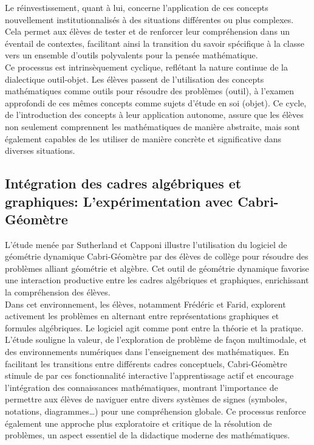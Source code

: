 Le réinvestissement,
quant à lui,
concerne l'application de ces concepts nouvellement institutionnalisés à des situations différentes ou plus complexes.
Cela permet aux élèves de tester et de renforcer leur compréhension dans un éventail de contextes,
facilitant ainsi la transition du savoir spécifique à la classe vers un ensemble d'outils polyvalents pour la pensée mathématique.\\

Ce processus est intrinsèquement cyclique,
reflétant la nature continue de la dialectique outil-objet.
Les élèves passent de l'utilisation des concepts mathématiques comme outils pour résoudre des problèmes (outil),
à l'examen approfondi de ces mêmes concepts comme sujets d'étude en soi (objet).
Ce cycle,
de l'introduction des concepts à leur application autonome,
assure que les élèves non seulement comprennent les mathématiques de manière abstraite,
mais sont également capables de les utiliser de manière concrète et significative dans diverses situations.

\subsection{Intégration des cadres algébriques et graphiques: L'expérimentation avec Cabri-Géomètre}

L'étude menée par Sutherland et Capponi illustre l'utilisation du logiciel de géométrie dynamique Cabri-Géomètre par des élèves de collège pour résoudre des problèmes alliant géométrie et algèbre.
Cet outil de géométrie dynamique favorise une interaction productive entre les cadres algébriques et graphiques,
enrichissant la compréhension des élèves.\\

Dans cet environnement,
les élèves,
notamment Frédéric et Farid,
explorent activement les problèmes en alternant entre représentations graphiques et formules algébriques.
Le logiciel agit comme pont entre la théorie et la pratique.\\

L'étude souligne la valeur,
de l'exploration de problème de façon multimodale,
et des environnements numériques dans l'enseignement des mathématiques.
En facilitant les transitions entre différents cadres conceptuels,
Cabri-Géomètre stimule de par ces fonctionnalité interactive l'apprentissage actif et encourage l'intégration des connaissances mathématiques,
montrant l'importance de permettre aux élèves de naviguer entre divers systèmes de signes (symboles, notations, diagrammes…) pour une compréhension globale.
Ce processus renforce également une approche plus exploratoire et critique de la résolution de problèmes,
un aspect essentiel de la didactique moderne des mathématiques.

